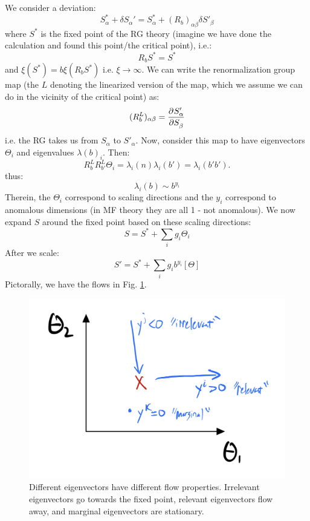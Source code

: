 We consider a deviation:
\begin{equation}
    S^*_\alpha + \delta S_\alpha' = S_\alpha^* + (R_b)_{\alpha\beta}\delta S'_\beta
\end{equation}
where $S^*$ is the fixed point of the RG theory (imagine we have done the calculation and found this point/the critical point), i.e.:
\begin{equation}
    R_bS^* = S^*
\end{equation}
and $\xi(S^*) = b\xi(R_b S^*)$ i.e. $\xi \to \infty$. We can write the renormalization group map (the $L$ denoting the linearized version of the map, which we assume we can do in the vicinity of the critical point) as:
\begin{equation}
   (R^L_b)_{\alpha\beta} = \dpd{S'_\alpha}{S_\beta}
\end{equation}
i.e. the RG takes us from $S_\alpha$ to $S'_\alpha$. Now, consider this map to have eigenvectors $\Theta_i$ and eigenvalues $\lambda(b)_i$. Then:
\begin{equation}
    R_b^L R_{b'}^L\Theta_i = \lambda_i(n)\lambda_i(b') = \lambda_i(b'b').
\end{equation}
thus:
\begin{equation}
    \lambda_i(b) \sim b^{y_i}
\end{equation}
Therein, the $\Theta_i$ correspond to scaling directions and the $y_i$ correspond to anomalous dimensions (in MF theory they are all 1 - not anomalous). We now expand $S$ around the fixed point based on these scaling directions:
\begin{equation}
    S = S^* + \sum_i g_i \Theta_i
\end{equation}
After we scale:
\begin{equation}
    S' = S^* + \sum_i g_i b^{y_i}[\Theta]
\end{equation}
Pictorally, we have the flows in Fig. \ref{fig:RGflows}.

\begin{figure}[htbp]
    \centering
    \includegraphics[scale=0.5]{Lectures/Figures/RGflows.png}
    \caption{Different eigenvectors have different flow properties. Irrelevant eigenvectors go towards the fixed point, relevant eigenvectors flow away, and marginal eigenvectors are stationary.}
    \label{fig:RGflows}
\end{figure}

